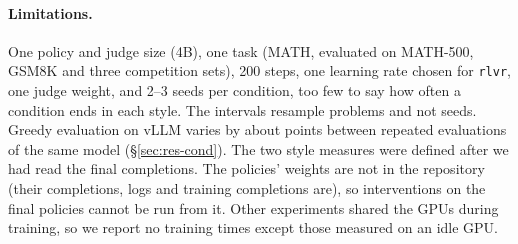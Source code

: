 \paragraph{Limitations.} One policy and judge size (4B), one task (MATH, evaluated on MATH-500, GSM8K and three
competition sets), 200 steps, one learning rate chosen for \texttt{rlvr}, one judge weight, and 2--3 seeds per
condition, too few to say how often a condition ends in each style. The intervals resample problems and not seeds.
Greedy evaluation on vLLM varies by about  points between repeated evaluations of the same model
(\S\ref{sec:res-cond}). The two style measures were defined after we had read the final completions. The policies'
weights are not in the repository (their completions, logs and training completions are), so interventions on the
final policies cannot be run from it. Other experiments shared the GPUs during training, so we report no training
times except those measured on an idle GPU.
